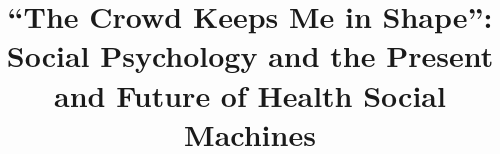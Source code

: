 \documentclass{sig-alternate}
\begin{document}
%

\title{``The Crowd Keeps Me in Shape'': Social Psychology and the Present and Future of Health Social Machines}
%
%
%
%
%
\end{document}

